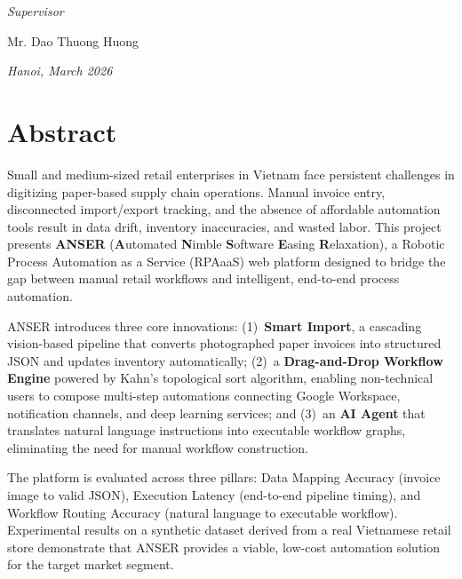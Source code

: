 \documentclass[11pt,a4paper]{report}
\begin{document}
\begin{titlepage}
    \vspace{0.5cm}

    {\emph{Supervisor}\par}
    \vspace{0.1cm}
    Mr. Dao Thuong Huong

    \vfill

    {\emph{Hanoi, March 2026}\par}
    \vspace*{0.5cm}
\end{titlepage}


\chapter*{Abstract}

Small and medium-sized retail enterprises in Vietnam face persistent challenges in digitizing paper-based supply chain operations. Manual invoice entry, disconnected import/export tracking, and the absence of affordable automation tools result in data drift, inventory inaccuracies, and wasted labor. This project presents \textbf{ANSER} (\textbf{A}utomated \textbf{N}imble \textbf{S}oftware \textbf{E}asing \textbf{R}elaxation), a Robotic Process Automation as a Service (RPAaaS) web platform designed to bridge the gap between manual retail workflows and intelligent, end-to-end process automation.

ANSER introduces three core innovations: (1)~\textbf{Smart Import}, a cascading vision-based pipeline that converts photographed paper invoices into structured JSON and updates inventory automatically; (2)~a \textbf{Drag-and-Drop Workflow Engine} powered by Kahn's topological sort algorithm, enabling non-technical users to compose multi-step automations connecting Google Workspace, notification channels, and deep learning services; and (3)~an \textbf{AI Agent} that translates natural language instructions into executable workflow graphs, eliminating the need for manual workflow construction.

The platform is evaluated across three pillars: Data Mapping Accuracy (invoice image to valid JSON), Execution Latency (end-to-end pipeline timing), and Workflow Routing Accuracy (natural language to executable workflow). Experimental results on a synthetic dataset derived from a real Vietnamese retail store demonstrate that ANSER provides a viable, low-cost automation solution for the target market segment.
\end{document}
